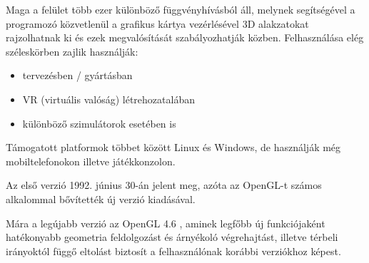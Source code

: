 Maga a felület több ezer különböző függvényhívásból áll, melynek segítségével a programozó közvetlenül a grafikus kártya vezérlésével 3D alakzatokat rajzolhatnak ki és ezek megvalósítását szabályozhatják közben. Felhasználása elég széleskörben zajlik használják:
\begin{itemize}
\item tervezésben / gyártásban 
\item VR (virtuális valóság) létrehozatalában 
\item különböző szimulátorok esetében is
\end{itemize}

Támogatott platformok többet között Linux és Windows, de használják még mobiltelefonokon illetve játékkonzolon.

Az első verzió 1992. június 30-án jelent meg, azóta az OpenGL-t számos alkalommal bővítették új verzió kiadásával.

Mára a legújabb verzió az OpenGL 4.6 , aminek legfőbb új funkciójaként  hatékonyabb geometria feldolgozást és árnyékoló végrehajtást, illetve térbeli irányoktól függő eltolást biztosít a felhasználónak korábbi verziókhoz képest.\cite{khronos1997opengl}







